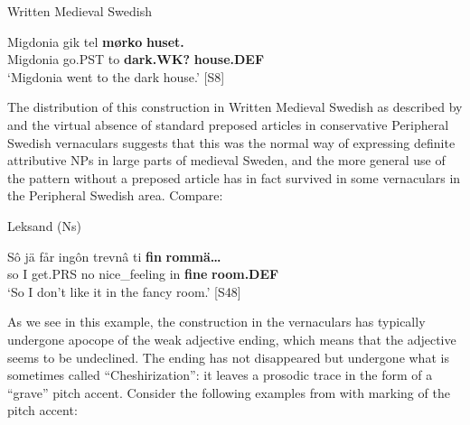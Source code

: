 Written Medieval Swedish



 \ea\label{}
\gll Migdonia  gik  tel  \textbf{mørko} \textbf{huset.}\\


Migdonia  go.PST  to  \textbf{dark.WK?} \textbf{house.DEF}\\

\glt ‘Migdonia went to the dark house.’ [S8]

\z

The distribution of this construction in Written Medieval Swedish as described by \citet{Larm1936} and the virtual absence of standard preposed articles in conservative Peripheral Swedish vernaculars suggests that this was the normal way of expressing definite attributive NPs in large parts of medieval Sweden, and the more general use of the pattern without a preposed article has in fact survived in some vernaculars in the Peripheral Swedish area. Compare: 


\item 

\label{bkm:Ref140985874}Leksand (Ns)



 \ea\label{}
\gll Sô  jä  får  ingôn  trevnâ  ti  \textbf{fin} \textbf{rommä…}\\


so  I  get.PRS  no  nice\_feeling  in  \textbf{fine} \textbf{room.DEF}\\

\glt ‘So I don’t like it in the fancy room.’ [S48]

\z

As we see in this example, the construction in the vernaculars has typically undergone apocope of the weak adjective ending, which means that the adjective seems to be undeclined. The ending has not disappeared but undergone what is sometimes called “Cheshirization”: it leaves a prosodic trace in the form of a “grave” pitch accent. Consider the following examples from \citet[148]{Levander1928} with marking of the pitch accent:

